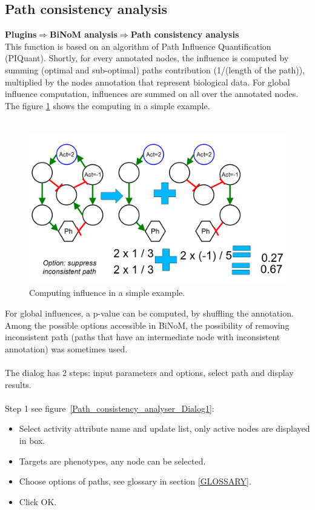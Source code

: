 \subsection{Path consistency analysis}
\textbf{Plugins$\Rightarrow$BiNoM analysis$\Rightarrow$Path consistency analysis}\\
This function is based on an algorithm of  Path Influence Quantification (PIQuant). Shortly, for every annotated nodes, the influence is computed by summing (optimal and sub-optimal) paths contribution (1/(length of the path)), multiplied by the nodes annotation that represent biological data. For global influence computation, influences are summed on all over the annotated nodes. The figure \ref{PIQuant_example} shows the computing in a simple example.\\\\
\begin{figure}
\centering
\includegraphics[width=17 cm]{graphics/PIQuant_example}
\caption{Computing influence in a simple example.}
\label{PIQuant_example}
\end{figure}
For global influences, a p-value can be computed, by shuffling the annotation. Among the possible options accessible in BiNoM, the possibility of removing inconsistent path (paths that have an intermediate node with inconsistent annotation) was sometimes used.\\\\
The dialog has 2 steps: input parameters and options, select path and display results.\\\\
Step 1 see figure~\ref{Path_consistency_analyser_Dialog1}:
\begin{itemize}
\item Select activity attribute name and update list, only active nodes are displayed in box.
\item Targets are phenotypes, any node can be selected.
\item Choose options of paths, see glossary in section \ref{GLOSSARY}.
\item  Click OK.
\end{itemize}
